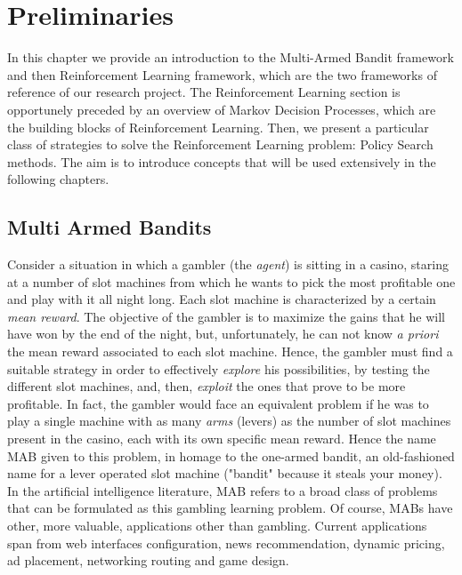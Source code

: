 
\chapter{Preliminaries} \label{Preliminaries}
In this chapter we provide an introduction to the Multi-Armed Bandit framework and then Reinforcement Learning framework, which are the two frameworks of reference of our research project. The Reinforcement Learning section is opportunely preceded by an overview of Markov Decision Processes, which are the building blocks of Reinforcement Learning. Then, we present a particular class of strategies to solve the Reinforcement Learning problem: Policy Search methods. The aim is to introduce concepts that will be used extensively in the following chapters.

\section{Multi Armed Bandits} \label{Multi Armed Bandits}
Consider a situation in which a gambler (the \emph{agent}) is sitting in a casino, staring at a number of slot machines from which he wants to pick the most profitable one and play with it all night long. Each slot machine is characterized by a certain \emph{mean reward}. The objective of the gambler is to maximize the gains that he will have won by the end of the night, but, unfortunately, he can not know \emph{a priori} the mean reward associated to each slot machine. Hence, the gambler must find a suitable strategy in order to effectively \emph{explore} his possibilities, by testing the different slot machines, and, then, \emph{exploit} the ones that prove to be more profitable. In fact, the gambler would face an equivalent problem if he was to play a single machine with as many \emph{arms} (levers) as the number of slot machines present in the casino, each with its own specific mean reward. Hence the name \gls{MAB} \cite{lai1985asymptotically} given to this problem, in homage to the one-armed bandit, an old-fashioned name for a lever operated slot machine ("bandit" because it steals your money). In the artificial intelligence literature, \gls{MAB} refers to a broad class of problems that can be formulated as this gambling learning problem. Of course, \gls{MAB}s have other, more valuable, applications other than gambling. Current applications span from web interfaces configuration, news recommendation, dynamic pricing, ad placement, networking routing and game design. 

